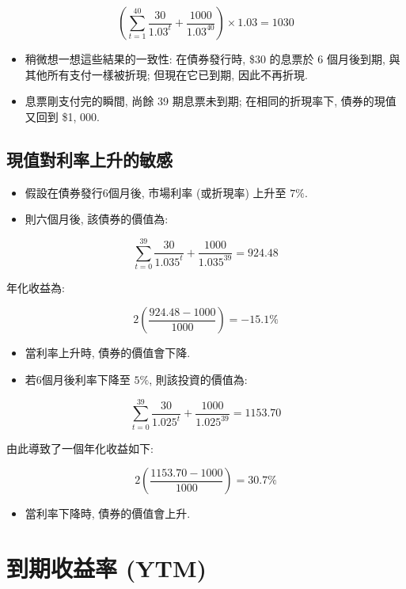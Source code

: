 \documentclass[letterpaper]{article}
\begin{document}
		
		$$
		\left (\sum_{t=1}^{40} \frac{30}{1.03^{t}}+\frac{1000}{1.03^{40}}\right) \times 1.03=1030
		$$
		
		\begin{itemize}
			\item 稍微想一想這些結果的一致性: 在債券發行時, \$30 的息票於 6 個月後到期, 與其他所有支付一樣被折現; 但現在它已到期, 因此不再折現.  
			\item 息票剛支付完的瞬間, 尚餘 39 期息票未到期; 在相同的折現率下, 債券的現值又回到 \$1{, }000.  
		\end{itemize}
		
		\subsection{現值對利率上升的敏感}
		
		\begin{itemize}
			\item 假設在債券發行6個月後, 市場利率 (或折現率) 上升至 \(7\%\).  
			\item 則六個月後, 該債券的價值為: 
		\end{itemize}
		
		
		$$
		\sum_{t=0}^{39} \frac{30}{1.035^{t}}+\frac{1000}{1.035^{39}}=924.48
		$$
		
		年化收益為: 
		
		$$
		2\left (\frac{924.48-1000}{1000}\right) =-15.1 \%
		$$
		
		\begin{itemize}
			\item 當利率上升時, 債券的價值會下降.  
			\item 若6個月後利率下降至 \(5\%\), 則該投資的價值為: 
		\end{itemize}
		
		$$
		\sum_{t=0}^{39} \frac{30}{1.025^{t}}+\frac{1000}{1.025^{39}}=1153.70
		$$
		
		由此導致了一個年化收益如下: 
		
		$$
		2\left (\frac{1153.70-1000}{1000}\right) =30.7 \%
		$$
		
		\begin{itemize}
			\item 當利率下降時, 債券的價值會上升.  
		\end{itemize}
		
		\section{到期收益率 (YTM) }
		
\end{document}
